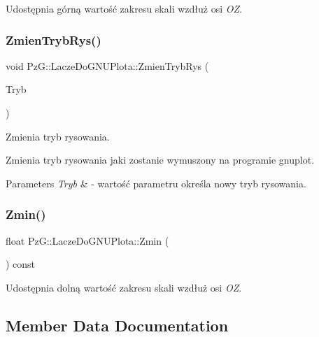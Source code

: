 Udostępnia górną wartość zakresu skali wzdłuż osi {\itshape OZ}. \mbox{\label{classPzG_1_1LaczeDoGNUPlota_a10950349b348fd3a3d4143e95337527c}} 
\subsubsection{\texorpdfstring{Zmien\+Tryb\+Rys()}{ZmienTrybRys()}}
{\footnotesize\ttfamily void Pz\+G\+::\+Lacze\+Do\+G\+N\+U\+Plota\+::\+Zmien\+Tryb\+Rys (\begin{DoxyParamCaption}\item[{\hyperlink{namespacePzG_aeedae1ef10c66d720f9e89de408ca4ca}{Tryb\+Rysowania}}]{Tryb }\end{DoxyParamCaption})\hspace{0.3cm}{\ttfamily [inline]}}



Zmienia tryb rysowania. 

Zmienia tryb rysowania jaki zostanie wymuszony na programie {\ttfamily gnuplot}. 
\begin{DoxyParams}{Parameters}
{\em Tryb} & -\/ wartość parametru określa nowy tryb rysowania. \\
\hline
\end{DoxyParams}
\mbox{\label{classPzG_1_1LaczeDoGNUPlota_a9068bd9a9873ba9c6d70016f1ae7cd7f}} 
\subsubsection{\texorpdfstring{Zmin()}{Zmin()}}
{\footnotesize\ttfamily float Pz\+G\+::\+Lacze\+Do\+G\+N\+U\+Plota\+::\+Zmin (\begin{DoxyParamCaption}{ }\end{DoxyParamCaption}) const\hspace{0.3cm}{\ttfamily [inline]}}

Udostępnia dolną wartość zakresu skali wzdłuż osi {\itshape OZ}. 

\subsection{Member Data Documentation}
\mbox{\label{classPzG_1_1LaczeDoGNUPlota_a1916c5a6fecfb3554e9d5204b2f2086c}} 
